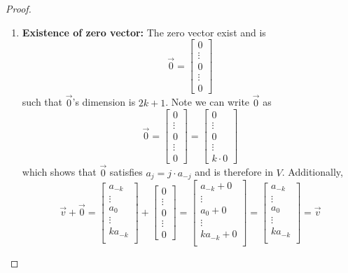 \documentclass[11pt]{article}
\newcommand{\vect}[1]{\begin{bmatrix}#1\end{bmatrix}}
\begin{document}
\begin{enumerate}[label=\arabic*.]
\begin{proof}
\begin{enumerate}
        \item \textbf{Existence of zero vector:} The zero vector exist and is
        $$\vec{0} = \vect{ 0 \\ \vdots \\ 0 \\ \vdots \\ 0 }$$ 
        such that $\vec{0}$'s dimension is $2k+1$. Note we can write $\vec{0}$ as
        $$\vec{0} = \vect{0 \\ \vdots \\ 0 \\ \vdots \\ 0} = \vect{0 \\ \vdots \\ 0 \\ \vdots \\ k\cdot 0}$$
        which shows that $\vec{0}$ satisfies $a_j=j\cdot a_{-j}$ and is therefore in $V$. Additionally, 
        $$\vec{v} + \vec{0}
        = \vect{a_{-k} \\ \vdots \\a_0 \\ \vdots \\ k a_{-k} \\} + \vect{0 \\ \vdots \\ 0 \\ \vdots \\ 0} 
        = \vect{a_{-k} +0 \\ \vdots \\a_0+0 \\ \vdots \\ k a_{-k} +0 \\} 
        = \vect{a_{-k} \\ \vdots \\a_0 \\ \vdots \\ k a_{-k} \\} 
        = \vec{v}
        $$
        

\end{enumerate}
\end{proof}
\end{enumerate}
\end{document}

